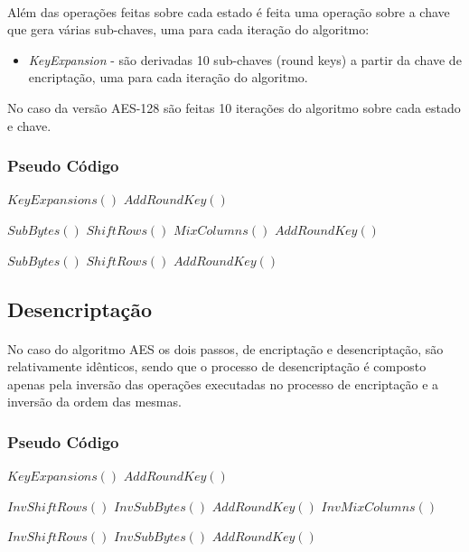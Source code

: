 \paragraph{} Além das operações feitas sobre cada estado é feita uma operação sobre a chave que gera várias sub-chaves, uma para cada iteração do algoritmo:

\begin{itemize}
\item \textit{KeyExpansion} - são derivadas 10 sub-chaves (round keys) a partir da chave de encriptação, uma para cada iteração do algoritmo.
\end{itemize}

No caso da versão AES-128 são feitas 10 iterações do algoritmo sobre cada estado e chave.

\subsubsection{Pseudo Código}

\begin{algorithmic}

\STATE $KeyExpansions()$
\STATE $AddRoundKey()$

    \STATE $SubBytes()$
    \STATE $ShiftRows()$
    \STATE $MixColumns()$
    \STATE $AddRoundKey()$
\ENDFOR

\STATE $SubBytes()$
\STATE $ShiftRows()$
\STATE $AddRoundKey()$

\end{algorithmic}

\subsection{Desencriptação}

\paragraph{} No caso do algoritmo AES os dois passos, de encriptação e desencriptação, são relativamente idênticos, sendo que o processo de desencriptação é composto apenas pela inversão das operações executadas no processo de encriptação e a inversão da ordem das mesmas.

\subsubsection{Pseudo Código}

\begin{algorithmic}

\STATE $KeyExpansions()$
\STATE $AddRoundKey()$

    \STATE $InvShiftRows()$
    \STATE $InvSubBytes()$
    \STATE $AddRoundKey()$
    \STATE $InvMixColumns()$
\ENDFOR

\STATE $InvShiftRows()$
\STATE $InvSubBytes()$
\STATE $AddRoundKey()$

\end{algorithmic}



